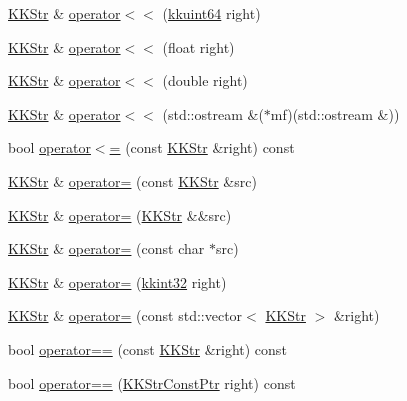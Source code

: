 \begin{DoxyCompactItemize}
\hyperlink{class_k_k_b_1_1_k_k_str}{K\+K\+Str} \& \hyperlink{class_k_k_b_1_1_k_k_str_a9d2363e983c76861972609a9fa7b132c}{operator$<$$<$} (\hyperlink{namespace_k_k_b_a1f2b0568d3b63cc7697dcff73250113e}{kkuint64} right)
\item 
\hyperlink{class_k_k_b_1_1_k_k_str}{K\+K\+Str} \& \hyperlink{class_k_k_b_1_1_k_k_str_ae38c1af7d18d6c9833574fc6e3bbbc70}{operator$<$$<$} (float right)
\item 
\hyperlink{class_k_k_b_1_1_k_k_str}{K\+K\+Str} \& \hyperlink{class_k_k_b_1_1_k_k_str_ad0b7a88fe98b5552c162b920e8b93174}{operator$<$$<$} (double right)
\item 
\hyperlink{class_k_k_b_1_1_k_k_str}{K\+K\+Str} \& \hyperlink{class_k_k_b_1_1_k_k_str_a22748d04c8725b58105284fa6e0c2cc1}{operator$<$$<$} (std\+::ostream \&($\ast$mf)(std\+::ostream \&))
\item 
bool \hyperlink{class_k_k_b_1_1_k_k_str_adc47ff57477959af27731a703ad1baf0}{operator$<$=} (const \hyperlink{class_k_k_b_1_1_k_k_str}{K\+K\+Str} \&right) const 
\item 
\hyperlink{class_k_k_b_1_1_k_k_str}{K\+K\+Str} \& \hyperlink{class_k_k_b_1_1_k_k_str_a766307156c71e62eb24cfffc878b84a7}{operator=} (const \hyperlink{class_k_k_b_1_1_k_k_str}{K\+K\+Str} \&src)
\item 
\hyperlink{class_k_k_b_1_1_k_k_str}{K\+K\+Str} \& \hyperlink{class_k_k_b_1_1_k_k_str_a1124ce265ab9512979e69094e07c4ed0}{operator=} (\hyperlink{class_k_k_b_1_1_k_k_str}{K\+K\+Str} \&\&src)
\item 
\hyperlink{class_k_k_b_1_1_k_k_str}{K\+K\+Str} \& \hyperlink{class_k_k_b_1_1_k_k_str_a30eae20777e67e01b01a991477a029c6}{operator=} (const char $\ast$src)
\item 
\hyperlink{class_k_k_b_1_1_k_k_str}{K\+K\+Str} \& \hyperlink{class_k_k_b_1_1_k_k_str_afc4cfccd6cc7f6c29e6bd094ab814d02}{operator=} (\hyperlink{namespace_k_k_b_a8fa4952cc84fda1de4bec1fbdd8d5b1b}{kkint32} right)
\item 
\hyperlink{class_k_k_b_1_1_k_k_str}{K\+K\+Str} \& \hyperlink{class_k_k_b_1_1_k_k_str_a592de83573bcfc26a573e20d1f8c3a57}{operator=} (const std\+::vector$<$ \hyperlink{class_k_k_b_1_1_k_k_str}{K\+K\+Str} $>$ \&right)
\item 
bool \hyperlink{class_k_k_b_1_1_k_k_str_a0735b08976ac3dbeb40978cf86165a79}{operator==} (const \hyperlink{class_k_k_b_1_1_k_k_str}{K\+K\+Str} \&right) const 
\item 
bool \hyperlink{class_k_k_b_1_1_k_k_str_aefbe7a493e94b9114139795c8e8c6c3d}{operator==} (\hyperlink{class_k_k_b_1_1_k_k_str_af0b636488a4f7497e5f65a576ccb55c8}{K\+K\+Str\+Const\+Ptr} right) const 

\end{DoxyCompactItemize}

